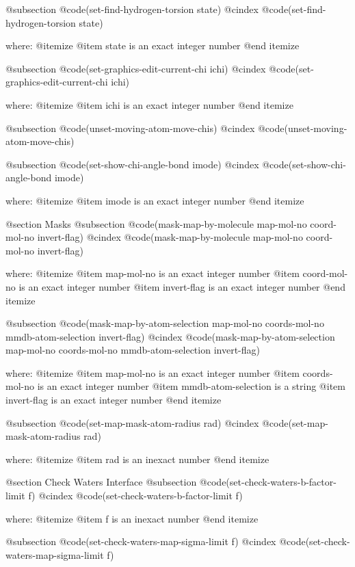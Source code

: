 @subsection @code{(set-find-hydrogen-torsion state)}
@cindex @code{(set-find-hydrogen-torsion state)}
 
where: 
 @itemize 
     @item state is an exact integer number
 @end itemize


@subsection @code{(set-graphics-edit-current-chi ichi)}
@cindex @code{(set-graphics-edit-current-chi ichi)}
 
where: 
 @itemize 
     @item ichi is an exact integer number
 @end itemize


@subsection @code{(unset-moving-atom-move-chis)}
@cindex @code{(unset-moving-atom-move-chis)}
 
@subsection @code{(set-show-chi-angle-bond imode)}
@cindex @code{(set-show-chi-angle-bond imode)}
 
where: 
 @itemize 
     @item imode is an exact integer number
 @end itemize



@section Masks 
@subsection @code{(mask-map-by-molecule map-mol-no coord-mol-no invert-flag)}
@cindex @code{(mask-map-by-molecule map-mol-no coord-mol-no invert-flag)}
 
where: 
 @itemize 
     @item map-mol-no is an exact integer number
     @item coord-mol-no is an exact integer number
     @item invert-flag is an exact integer number
 @end itemize


@subsection @code{(mask-map-by-atom-selection map-mol-no coords-mol-no mmdb-atom-selection invert-flag)}
@cindex @code{(mask-map-by-atom-selection map-mol-no coords-mol-no mmdb-atom-selection invert-flag)}
 
where: 
 @itemize 
     @item map-mol-no is an exact integer number
     @item coords-mol-no is an exact integer number
     @item mmdb-atom-selection is a string
     @item invert-flag is an exact integer number
 @end itemize


@subsection @code{(set-map-mask-atom-radius rad)}
@cindex @code{(set-map-mask-atom-radius rad)}
 
where: 
 @itemize 
     @item rad is an inexact number
 @end itemize



@section Check Waters Interface 
@subsection @code{(set-check-waters-b-factor-limit f)}
@cindex @code{(set-check-waters-b-factor-limit f)}
 
where: 
 @itemize 
     @item f is an inexact number
 @end itemize


@subsection @code{(set-check-waters-map-sigma-limit f)}
@cindex @code{(set-check-waters-map-sigma-limit f)}
 
